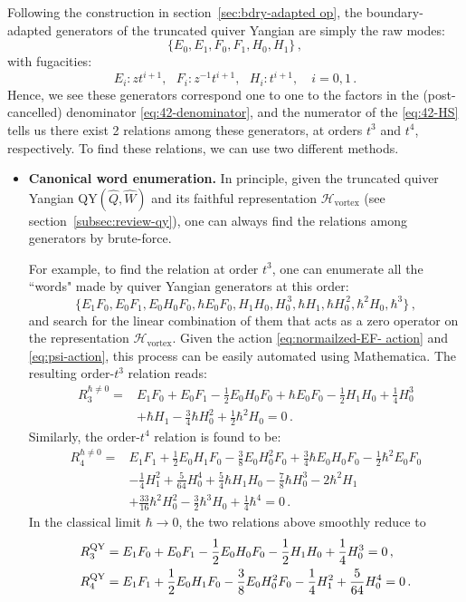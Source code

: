 \documentclass[12pt,a4paper]{article}
\begin{document}
Following the construction in section~\ref{sec:bdry-adapted op}, the boundary-adapted generators of the truncated quiver Yangian are simply the raw modes:
\begin{equation}
 \{E_0,E_1,F_0,F_1,H_0,H_1\}\,,
 \label{eq:42-modes}
\end{equation}
with fugacities:
\begin{equation}
    E_i: z t^{i+1}, \ \ \ F_i: z^{-1}t^{i+1}, \ \ \ H_i: t^{i+1},\quad i=0,1\,.
\end{equation}
Hence, we see these generators correspond one to one to the factors in the (post-cancelled) denominator \eqref{eq:42-denominator}, and the numerator of the \eqref{eq:42-HS} tells us there exist 2 relations among these generators, at orders $t^3$ and $t^4$, respectively. To find these relations, we can use two different methods.
\begin{itemize}
    \item \textbf{Canonical word enumeration.} In principle, given the truncated quiver Yangian QY$(\hat{Q},\hat W)$ and its faithful representation $\mathcal H_{\text{vortex}} $ (see section~\ref{subsec:review-qy}), one can always find the relations among generators by brute-force. 
    
    For example, to find the relation at order $t^3$, one can enumerate all the ``words" made by quiver Yangian generators at this order:
    \begin{equation}
       \{E_1F_0,E_0F_1,E_0H_0F_0,\hbar E_0F_0, H_1H_0,H_0^{\,3},\hbar H_1,\hbar H_0^{\,2},\hbar^2 H_0,\hbar^3\}\,,
    \end{equation}
    and search for the linear combination of them that acts as a zero operator on the representation $\mathcal H_{\text{vortex}}$. Given the action \eqref{eq:normailzed-EF- action} and \eqref{eq:psi-action}, this process can be easily automated using Mathematica. The resulting order-$t^3$ relation reads:
    \begin{align}
R_3^{\hbar\neq 0}=&E_1F_0+E_0F_1-\frac12E_0H_0F_0+\hbar E_0F_0
-\frac12 H_1H_0+\frac14H_0^3
\nonumber\\
&+\hbar H_1-\frac34\hbar H_0^2+\frac12\hbar^2H_0=0\,.
\label{eq:42-t3}
\end{align}
Similarly, the order-$t^4$ relation is found to be:
\begin{align}
R_4^{\hbar\neq 0}=&E_1F_1+\frac12E_0H_1F_0-\frac38E_0H_0^2F_0
+\frac34\hbar E_0H_0F_0-\frac12\hbar^2E_0F_0
\nonumber\\
&-\frac14 H_1^2+\frac5{64} H_0^4
+\frac54\hbar H_1H_0-\frac78\hbar H_0^3
-2\hbar^2H_1
\nonumber\\
&+\frac{33}{16}\hbar^2H_0^2-\frac32\hbar^3H_0+\frac14\hbar^4=0\,.
\label{eq:42-t4}
\end{align}
In the classical limit $\hbar\to0$, the two relations above smoothly reduce to 
\begin{align}
 R_3^{\rm QY}={}&E_1F_0+E_0F_1-\frac12E_0H_0F_0
 -\frac12H_1H_0+\frac14H_0^3=0\,,
 \label{eq:42-t3-classical}\\
 R_4^{\rm QY}={}&E_1F_1+\frac12E_0H_1F_0
 -\frac38E_0H_0^2F_0-\frac14H_1^2
 +\frac5{64}H_0^4=0\,.
 \label{eq:42-t4-classical}
\end{align}


\end{itemize}
\end{document}
